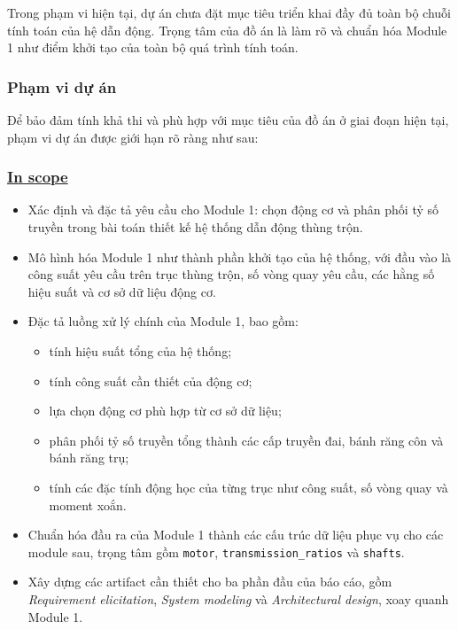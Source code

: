 \documentclass[a4paper]{article}
\begin{document}
Trong phạm vi hiện tại, dự án chưa đặt mục tiêu triển khai đầy đủ toàn bộ chuỗi tính toán của hệ dẫn động. Trọng tâm của đồ án là làm rõ và chuẩn hóa Module 1 như điểm khởi tạo của toàn bộ quá trình tính toán.

\subsubsection{Phạm vi dự án}

Để bảo đảm tính khả thi và phù hợp với mục tiêu của đồ án ở giai đoạn hiện tại, phạm vi dự án được giới hạn rõ ràng như sau:

\subsubsection*{\uline{In scope}}

\begin{itemize}
\item Xác định và đặc tả yêu cầu cho Module 1: chọn động cơ và phân phối tỷ số truyền trong bài toán thiết kế hệ thống dẫn động thùng trộn.
\item Mô hình hóa Module 1 như thành phần khởi tạo của hệ thống, với đầu vào là công suất yêu cầu trên trục thùng trộn, số vòng quay yêu cầu, các hằng số hiệu suất và cơ sở dữ liệu động cơ.
\item Đặc tả luồng xử lý chính của Module 1, bao gồm:
\begin{itemize}
\item tính hiệu suất tổng của hệ thống;
\item tính công suất cần thiết của động cơ;
\item lựa chọn động cơ phù hợp từ cơ sở dữ liệu;
\item phân phối tỷ số truyền tổng thành các cấp truyền đai, bánh răng côn và bánh răng trụ;
\item tính các đặc tính động học của từng trục như công suất, số vòng quay và moment xoắn.
\end{itemize}
\item Chuẩn hóa đầu ra của Module 1 thành các cấu trúc dữ liệu phục vụ cho các module sau, trọng tâm gồm \texttt{motor}, \texttt{transmission\_ratios} và \texttt{shafts}.
\item Xây dựng các artifact cần thiết cho ba phần đầu của báo cáo, gồm \textit{Requirement elicitation}, \textit{System modeling} và \textit{Architectural design}, xoay quanh Module 1.
\end{itemize}
\end{document}
